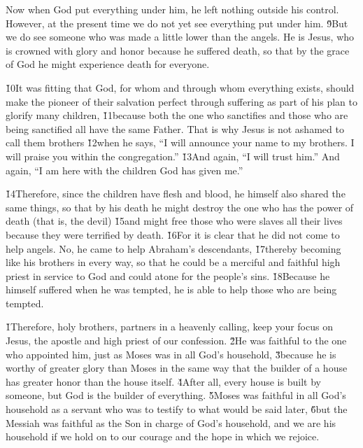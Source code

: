 Now when God put everything under him, he left nothing outside his control. However, at the present time we do not yet see everything put under him. \v{9}But we do see someone who was made a little lower than the angels. He is Jesus, who is crowned with glory and honor because he suffered death, so that by the grace of God he might experience death for everyone.

\v{10}It was fitting that God, for whom and through whom everything exists, should make the pioneer of their salvation perfect through suffering as part of his plan to glorify many children, \v{11}because both the one who sanctifies and those who are being sanctified all have the same Father. That is why Jesus is not ashamed to call them brothers \v{12}when he says, ``I will announce your name to my brothers. I will praise you within the congregation.'' \v{13}And again, ``I will trust him.'' And again, ``I am here with the children God has given me.''

\v{14}Therefore, since the children have flesh and blood, he himself also shared the same things, so that by his death he might destroy the one who has the power of death (that is, the devil) \v{15}and might free those who were slaves all their lives because they were terrified by death. \v{16}For it is clear that he did not come to help angels. No, he came to help Abraham's descendants, \v{17}thereby becoming like his brothers in every way, so that he could be a merciful and faithful high priest in service to God and could atone for the people's sins. \v{18}Because he himself suffered when he was tempted, he is able to help those who are being tempted.

\v{1}Therefore, holy brothers, partners in a heavenly calling, keep your focus on Jesus, the apostle and high priest of our confession. \v{2}He was faithful to the one who appointed him, just as Moses was in all God's household, \v{3}because he is worthy of greater glory than Moses in the same way that the builder of a house has greater honor than the house itself. \v{4}After all, every house is built by someone, but God is the builder of everything. \v{5}Moses was faithful in all God's household as a servant who was to testify to what would be said later, \v{6}but the Messiah was faithful as the Son in charge of God's household, and we are his household if we hold on to our courage and the hope in which we rejoice.

